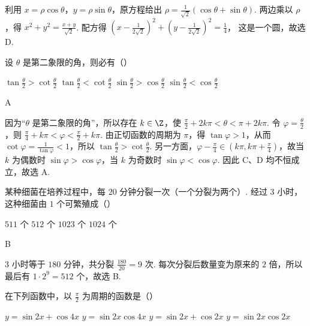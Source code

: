 \documentclass[UTF8,a4paper,oneside,11pt]{ctexbook}
\begin{document}
\begin{solution}
利用 \(x=\rho\cos\theta\)，\(y=\rho\sin\theta\)，原方程给出 \(\rho=\frac{1}{\sqrt{2}}\left(\cos\theta+\sin\theta\right)\). 两边乘以 \(\rho\)，得 \(x^2+y^2=\frac{x+y}{\sqrt{2}}\). 配方得 \(\left(x-\frac{1}{2\sqrt{2}}\right)^2+\left(y-\frac{1}{2\sqrt{2}}\right)^2=\frac14\)，
这是一个圆，故选 D.
\end{solution}

\begin{problem}
设 \(\theta\) 是第二象限的角，则必有（\quad）

\choices
    {\(\tan \frac{\theta}{2} > \cot \frac{\theta}{2}\)}
    {\(\tan \frac{\theta}{2} < \cot \frac{\theta}{2}\)}
    {\(\sin \frac{\theta}{2} > \cos \frac{\theta}{2}\)}
    {\(\sin \frac{\theta}{2} < \cos \frac{\theta}{2}\)}
\end{problem}

\begin{answer}
A
\end{answer}

\begin{solution}
因为“\(\theta\) 是第二象限的角”，所以存在 \(k\in\Z\)，使
\(\frac{\pi}{2}+2k\pi<\theta<\pi+2k\pi\). 令 \(\varphi=\frac{\theta}{2}\)，则
\(\frac{\pi}{4}+k\pi<\varphi<\frac{\pi}{2}+k\pi\).
由正切函数的周期为 \(\pi\)，得 \(\tan\varphi>1\)，从而 \(\cot\varphi=\frac{1}{\tan\varphi}<1\)，所以
\(\tan\frac{\theta}{2}>\cot\frac{\theta}{2}\).
另一方面，\(\varphi-\frac{\pi}{4}\in(k\pi,k\pi+\frac{\pi}{4})\)，故当 \(k\) 为偶数时 \(\sin\varphi>\cos\varphi\)，当 \(k\) 为奇数时 \(\sin\varphi<\cos\varphi\). 因此 C、D 均不恒成立，故选 A.
\end{solution}

\begin{problem}
某种细菌在培养过程中，每 \(20\) 分钟分裂一次（一个分裂为两个）. 经过 \(3\) 小时，这种细菌由 \(1\) 个可繁殖成（\quad）

\choices
    {\(511\) 个}
    {\(512\) 个}
    {\(1023\) 个}
    {\(1024\) 个}
\end{problem}

\begin{answer}
B
\end{answer}

\begin{solution}
3 小时等于 \(180\) 分钟，共分裂 \(\frac{180}{20}=9\) 次. 每次分裂后数量变为原来的 \(2\) 倍，所以最后有 \(1\cdot 2^9=512\) 个，故选 B.
\end{solution}

\begin{problem}
在下列函数中，以 \(\frac{\pi}{2}\) 为周期的函数是（\quad）

\choices
    {\(y = \sin 2x + \cos 4x\)}
    {\(y = \sin 2x\cos 4x \)}
    {\(y = \sin 2x + \cos 2x \)}
    {\(y = \sin 2x\cos 2x \)}
\end{problem}
\end{document}
